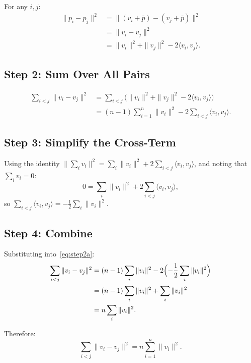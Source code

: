 \documentclass[11pt,a4paper]{article}
\begin{document}
For any $i, j$:
\begin{align}
  \|p_i - p_j\|^2
  &= \|(v_i + \bar{p}) - (v_j + \bar{p})\|^2 \\
  &= \|v_i - v_j\|^2 \\
  &= \|v_i\|^2 + \|v_j\|^2 - 2\langle v_i, v_j\rangle.
\end{align}

\subsection{Step 2: Sum Over All Pairs}

\begin{align}
  \sum_{i<j} \|v_i - v_j\|^2
  &= \sum_{i<j} \bigl(\|v_i\|^2 + \|v_j\|^2
     - 2\langle v_i, v_j\rangle\bigr) \\
  &= (n-1)\sum_{i=1}^n \|v_i\|^2
     - 2\sum_{i<j}\langle v_i, v_j\rangle.
     \label{eq:step2a}
\end{align}

\subsection{Step 3: Simplify the Cross-Term}

Using the identity
$\bigl\|\sum_i v_i\bigr\|^2 = \sum_i \|v_i\|^2
+ 2\sum_{i<j}\langle v_i, v_j\rangle$,
and noting that $\sum_i v_i = 0$:
\begin{equation}
  0 = \sum_i \|v_i\|^2 + 2\sum_{i<j}\langle v_i, v_j\rangle,
\end{equation}
so $\sum_{i<j}\langle v_i, v_j\rangle
= -\frac{1}{2}\sum_i \|v_i\|^2$.

\subsection{Step 4: Combine}

Substituting into~\eqref{eq:step2a}:
\begin{align}
  \sum_{i<j}\|v_i - v_j\|^2
  &= (n-1)\sum_i \|v_i\|^2
     - 2\Bigl(-\frac{1}{2}\sum_i\|v_i\|^2\Bigr) \\
  &= (n-1)\sum_i\|v_i\|^2 + \sum_i\|v_i\|^2 \\
  &= n\sum_i\|v_i\|^2.
\end{align}

Therefore:
\begin{equation}\label{eq:sum_sq}
  \sum_{i<j}\|v_i - v_j\|^2 = n\sum_{i=1}^n \|v_i\|^2.
\end{equation}
\end{document}
